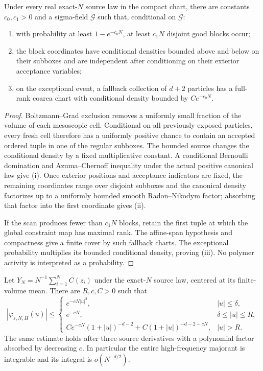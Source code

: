 \begin{lemma}
\label{lem:r16-b1-blocks}
Under every real exact-\(N\) source law in the compact chart, there are
constants \(c_0,c_1>0\) and a sigma-field \(\mathcal G\) such that, conditional
on \(\mathcal G\):
\begin{enumerate}[label=(\roman*)]
\item with probability at least \(1-e^{-c_0N}\), at least \(c_1N\) disjoint
good blocks occur;
\item the block coordinates have conditional densities bounded above and
below on their subboxes and are independent after conditioning on their
exterior acceptance variables;
\item on the exceptional event, a fallback collection of \(d+2\) particles
has a full-rank coarea chart with conditional density bounded by
\(Ce^{-c_0N}\).
\end{enumerate}
\end{lemma}

\begin{proof}
Boltzmann--Grad exclusion removes a uniformly small fraction of the volume of
each mesoscopic cell.  Conditional on all previously exposed particles, every
fresh cell therefore has a uniformly positive chance to contain an accepted
ordered tuple in one of the regular subboxes.  The bounded source changes the
conditional density by a fixed multiplicative constant.  A conditional
Bernoulli domination and Azuma--Chernoff inequality under the actual positive
canonical law give (i).  Once exterior positions and acceptance indicators
are fixed, the remaining coordinates range over disjoint subboxes and the
canonical density factorizes up to a uniformly bounded smooth Radon--Nikodym
factor; absorbing that factor into the first coordinate gives (ii).

If the scan produces fewer than \(c_1N\) blocks, retain the first tuple at
which the global constraint map has maximal rank.  The affine-span hypothesis
and compactness give a finite cover by such fallback charts.  The exceptional
probability multiplies its bounded conditional density, proving (iii).  No
polymer activity is interpreted as a probability.
\end{proof}

\begin{theorem}
\label{thm:r16-b1-fourier}
Let \(Y_N=N^{-1}\sum_{i=1}^NC(z_i)\) under the exact-\(N\) source law, centered
at its finite-volume mean.  There are \(R,c,C>0\) such that
\[
 |\varphi_{\varepsilon,N,H}(u)|
 \le
 \begin{cases}
 e^{-cN|u|^2},&|u|\le\delta,\\
 e^{-cN},&\delta\le|u|\le R,\\
 C e^{-cN}(1+|u|)^{-d-2}
 +C(1+|u|)^{-d-2-cN},&|u|>R.
 \end{cases}
\]
The same estimate holds after three source derivatives with a polynomial
factor absorbed by decreasing \(c\).  In particular the entire high-frequency
majorant is integrable and its integral is \(o(N^{-d/2})\).
\end{theorem}

